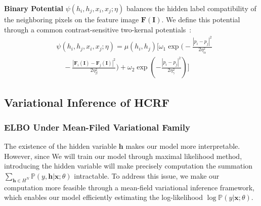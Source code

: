 \documentclass[conference]{IEEEtran}
\newcommand{\PP}{{\mathbb{P}}}
\newcommand{\Fb}{\mathbf{F}}
\newcommand{\Ib}{\mathbf{I}}
\newcommand{\hb}{\mathbf{h}}
\newcommand{\xb}{\mathbf{x}}
\begin{document}
{\textbf{Binary Potential}}
$\psi(h_i, h_j, x_i, x_j; \eta)$
balances the hidden label compatibility of the neighboring pixels on the 
feature image $\Fb(\Ib)$.
We define this potential through a common contrast-sensitive two-kernal 
potentials~\citep{krahenbuhl2011efficient, chen2022end}:
\begin{equation}
\begin{split}
& \psi(h_i, h_j, x_i, x_j; \eta) = \mu(h_i, h_j) \Bigg[
\omega_1 \exp \bigg(
-\frac{\left\lvert p_i - p_j \right\rvert^2}{2\eta_\alpha^2} \\
&\quad
- \frac{\left\lvert \Fb_i(\Ib) - \Fb_j(\Ib)\right\rvert^2}{2\eta_\beta^2}
\bigg)
+ \omega_2 \exp \left(
- \frac{\left\lvert p_i - p_j \right\rvert^2}{2 \eta_\gamma^2}
\right)
\Bigg]
\end{split}
\end{equation}


\subsection{Variational Inference of HCRF}


\subsubsection{ELBO Under Mean-Filed Variational Family}


The existence of the hidden variable $\hb$ makes our model more interpretable.
However, since We will train our model through maximal likelihood method,
introducing the hidden variable will make precisely computation the summation
$\sum_{\hb \in H^N} \PP(y, \hb \vert \xb; \theta)$ intractable.
To address this issue, we make our computation more feasible through a
mean-field variational inference framework, which enables our model
efficiently estimating the log-likelihood $\log\PP(y \vert \xb; \theta)$.
\end{document}
